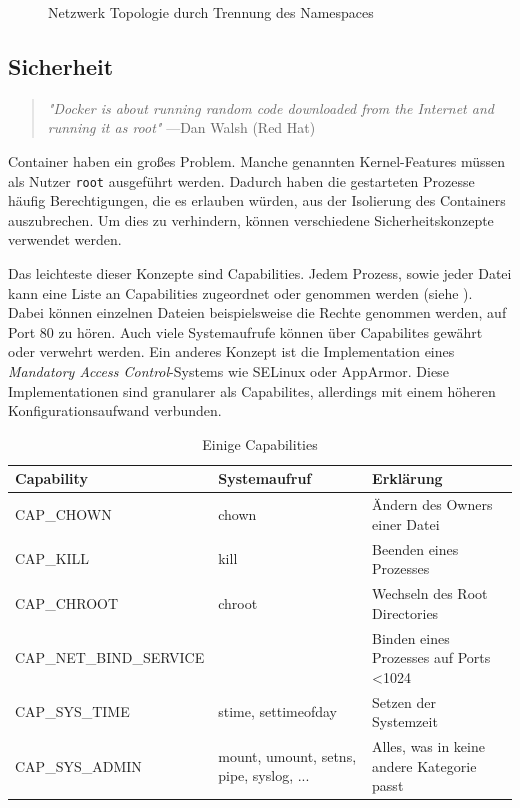 \begin{figure}[h]
	\begin{center}
		\caption{Netzwerk Topologie durch Trennung des Namespaces}
		\label{fig:containerHostNetwork}
	\end{center}
\end{figure} 


\subsection{Sicherheit}
\label{sec:sicherheit}

\begin{quote}
	\textit{"Docker is about running random code downloaded from the Internet and running it as root"}
	\flushright
	\small{---Dan Walsh (Red Hat)}
\end{quote}

Container haben ein großes Problem. Manche genannten Kernel-Features müssen als Nutzer \texttt{root} ausgeführt werden. Dadurch haben die gestarteten Prozesse häufig Berechtigungen, die es erlauben würden, aus der Isolierung des Containers auszubrechen. Um dies zu verhindern, können verschiedene Sicherheitskonzepte verwendet werden.

Das leichteste dieser Konzepte sind Capabilities. Jedem Prozess, sowie jeder Datei kann eine Liste an Capabilities zugeordnet oder genommen werden (siehe ). Dabei können einzelnen Dateien beispielsweise die Rechte genommen werden, auf Port 80 zu hören. Auch viele Systemaufrufe können über Capabilites gewährt oder verwehrt werden. Ein anderes Konzept ist die Implementation eines \textit{Mandatory Access Control}-Systems wie SELinux oder AppArmor. Diese Implementationen sind granularer als Capabilites, allerdings mit einem höheren Konfigurationsaufwand verbunden.

\begin{table}[h]
	\begin{center}
		\begin{tabu}to 0.9
			\toprule
			Capability 		& Systemaufruf 			& Erklärung						\\
			\midrule
			CAP\_CHOWN 		& chown 				& Ändern des Owners einer Datei \\
			CAP\_KILL 		& kill 					& Beenden eines Prozesses		\\
			CAP\_CHROOT		& chroot				& Wechseln des Root Directories	\\
			\midrule
			CAP\_NET\_BIND\_SERVICE & & Binden eines Prozesses auf Ports \textless 1024 \\
			\midrule
			CAP\_SYS\_TIME	& stime, settimeofday	& Setzen der Systemzeit 		\\
			CAP\_SYS\_ADMIN	& mount, umount, setns, pipe, syslog, ... 	& Alles, was in keine andere Kategorie passt 														\\
			\bottomrule
		\end{tabu}
	\end{center}
	\caption{Einige Capabilities \citep{Capabilities7LinuxManualPage}}
	\label{tab:capabilities}
\end{table}

